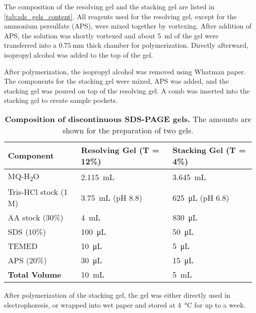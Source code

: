 The composition of the resolving gel and the stacking gel are listed in \autoref{tab:sds_gels_content}. All reagents used for the resolving gel, except for the ammonium persulfate (APS), were mixed together by vortexing. After addition of APS, the solution was shortly vortexed and about \SI{5}{\milli\litre} of the gel were transferred into a $\SI{0.75}{\milli\metre}$ thick chamber for polymerization. Directly afterward, isopropyl alcohol was added to the top of the gel. 

After polymerization, the isopropyl alcohol was removed using Whatman paper. The components for the stacking gel were mixed, APS was added, and the stacking gel was poured on top of the resolving gel. A comb was inserted into the stacking gel to create sample pockets.

\begin{table}[h]
    \label{tab:sds_gels_content}
    \centering
    \caption{\textbf{Composition of discontinuous SDS-PAGE gels.} The amounts are shown for the preparation of two gels.}
    \begin{tabular}{@{}lll@{}}
    \toprule
    \textbf{Component} & \textbf{Resolving Gel (T = 12\%)} & \textbf{Stacking Gel (T = 4\%)} \\
    \midrule
    MQ-H\textsubscript{2}O       & \SI{2.115}{\milli\liter} & \SI{3.645}{\milli\liter} \\
    Tris-HCl stock (1 M)                    & \SI{3.75}{\milli\liter} (pH 8.8)  & \SI{625}{\micro\liter} (pH 6.8)  \\
    AA stock (30\%)                                       & \SI{4}{\milli\liter}     & \SI{830}{\micro\liter}   \\
    SDS (10\%)                                            & \SI{100}{\micro\liter}   & \SI{50}{\micro\liter}    \\
    TEMED                                                & \SI{10}{\micro\liter}    & \SI{5}{\micro\liter}     \\
    APS (20\%)                                            & \SI{30}{\micro\liter}    & \SI{15}{\micro\liter}    \\
    \textbf{Total Volume}                                 & \SI{10}{\milli\liter}    & \SI{5}{\milli\liter}     \\
    \bottomrule
    \end{tabular}
\end{table}

After polymerization of the stacking gel, the gel was either directly used in electrophoresis, or wrapped into wet paper and stored at \SI{4}{\degreeCelsius} for up to a week. 

